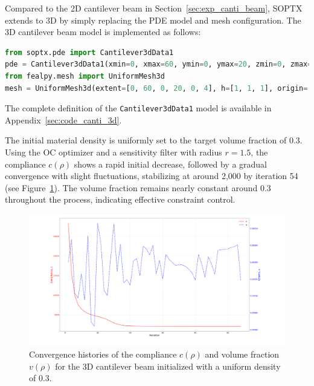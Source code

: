 \documentclass[mathpazo]{cicp}
\begin{document}
Compared to the 2D cantilever beam in Section~\ref{sec:exp_canti_beam}, SOPTX extends to 3D by simply replacing the PDE model and mesh configuration. The 3D cantilever beam model is implemented as follows:
\begin{lstlisting}[language=python]
from soptx.pde import Cantilever3dData1
pde = Cantilever3dData1(xmin=0, xmax=60, ymin=0, ymax=20, zmin=0, zmax=4, T=-1)
from fealpy.mesh import UniformMesh3d
mesh = UniformMesh3d(extent=[0, 60, 0, 20, 0, 4], h=[1, 1, 1], origin=[0, 0, 0])
\end{lstlisting}
The complete definition of the \texttt{Cantilever3dData1} model is available in Appendix~\ref{sec:code_canti_3d}.

The initial material density is uniformly set to the target volume fraction of 0.3. Using the OC optimizer and a sensitivity filter with radius $r=1.5$, the compliance $c(\rho)$ shows a rapid initial decrease, followed by a gradual convergence with slight fluctuations, stabilizing at around 2,000 by iteration 54 (see Figure~\ref{fig:canti_3d_convergence}). The volume fraction remains nearly constant around 0.3 throughout the process, indicating effective constraint control.
\begin{figure}[htbp]
	\centering
	\includegraphics[width=1.0\textwidth]{figures/cantilever_3d_convergence.png}
	\caption{Convergence histories of the compliance $c(\rho)$ and volume fraction $v(\rho)$ for the 3D cantilever beam initialized with a uniform density of 0.3.}
	\label{fig:canti_3d_convergence}
\end{figure}
\end{document}
